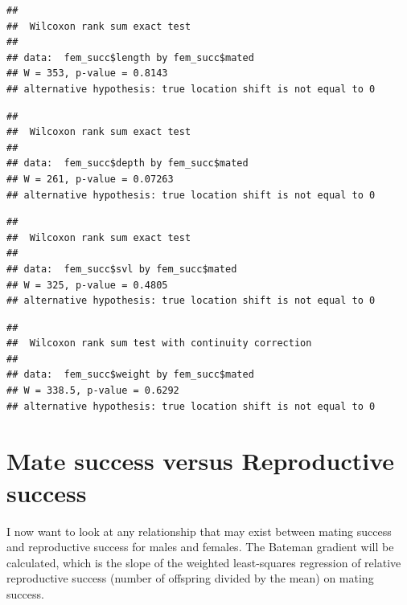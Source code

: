 \documentclass[
]{article}
\begin{document}
\begin{verbatim}
## 
##  Wilcoxon rank sum exact test
## 
## data:  fem_succ$length by fem_succ$mated
## W = 353, p-value = 0.8143
## alternative hypothesis: true location shift is not equal to 0
\end{verbatim}

\begin{verbatim}
## 
##  Wilcoxon rank sum exact test
## 
## data:  fem_succ$depth by fem_succ$mated
## W = 261, p-value = 0.07263
## alternative hypothesis: true location shift is not equal to 0
\end{verbatim}

\begin{verbatim}
## 
##  Wilcoxon rank sum exact test
## 
## data:  fem_succ$svl by fem_succ$mated
## W = 325, p-value = 0.4805
## alternative hypothesis: true location shift is not equal to 0
\end{verbatim}

\begin{verbatim}
## 
##  Wilcoxon rank sum test with continuity correction
## 
## data:  fem_succ$weight by fem_succ$mated
## W = 338.5, p-value = 0.6292
## alternative hypothesis: true location shift is not equal to 0
\end{verbatim}

\hypertarget{mate-success-versus-reproductive-success}{%
\section{Mate success versus Reproductive success}\label{mate-success-versus-reproductive-success}}

I now want to look at any relationship that may exist between mating success and reproductive success for males and females. The Bateman gradient will be calculated, which is the slope of the weighted least-squares regression of relative reproductive success (number of offspring divided by the mean) on mating success.
\end{document}
